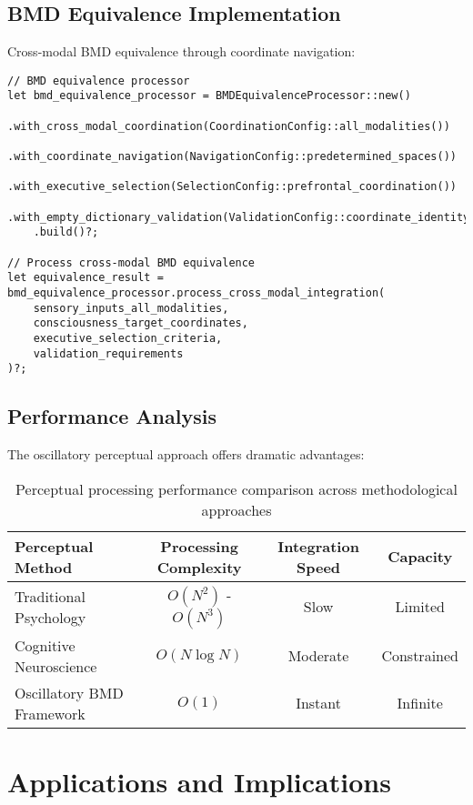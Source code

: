 \documentclass[12pt,a4paper]{article}
\begin{document}
\subsection{BMD Equivalence Implementation}

Cross-modal BMD equivalence through coordinate navigation:

\begin{verbatim}
// BMD equivalence processor
let bmd_equivalence_processor = BMDEquivalenceProcessor::new()
    .with_cross_modal_coordination(CoordinationConfig::all_modalities())
    .with_coordinate_navigation(NavigationConfig::predetermined_spaces())
    .with_executive_selection(SelectionConfig::prefrontal_coordination())
    .with_empty_dictionary_validation(ValidationConfig::coordinate_identity())
    .build()?;

// Process cross-modal BMD equivalence
let equivalence_result = bmd_equivalence_processor.process_cross_modal_integration(
    sensory_inputs_all_modalities,
    consciousness_target_coordinates,
    executive_selection_criteria,
    validation_requirements
)?;
\end{verbatim}

\subsection{Performance Analysis}

The oscillatory perceptual approach offers dramatic advantages:

\begin{table}[H]
\centering
\begin{tabular}{lccc}
\toprule
Perceptual Method & Processing Complexity & Integration Speed & Capacity \\
\midrule
Traditional Psychology & $O(N^2)$ - $O(N^3)$ & Slow & Limited \\
Cognitive Neuroscience & $O(N \log N)$ & Moderate & Constrained \\
Oscillatory BMD Framework & $O(1)$ & Instant & Infinite \\
\bottomrule
\end{tabular}
\caption{Perceptual processing performance comparison across methodological approaches}
\end{table}

\section{Applications and Implications}
\end{document}
